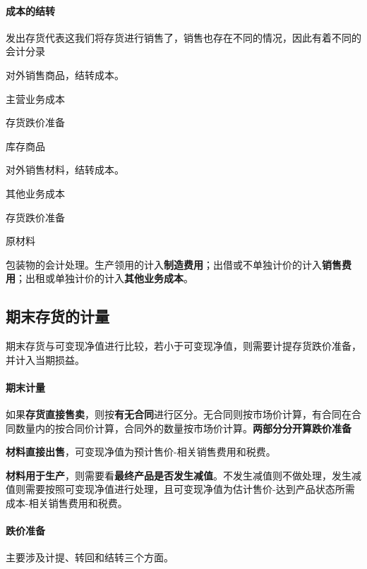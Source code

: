 \documentclass[UTF8,12pt]{ctexart}
\newenvironment{Dr}{%
	\begin{list}{}%
		{
			\setlength{\leftmargin}{2em}
			\setlength{\labelwidth}{2em}
			\setlength{\labelsep}{0pt}
			\setlength{\itemindent}{0pt}
			\setlength{\listparindent}{0pt}
			\setlength{\parsep}{0pt}
			\setlength{\topsep}{0pt}
		}
		\item[\textbf{借：}]
	}{%
	\end{list}
}
\newenvironment{Cr}{%
	\begin{list}{}%
		{
			\setlength{\leftmargin}{2em}
			\setlength{\labelwidth}{2em}
			\setlength{\labelsep}{0pt}
			\setlength{\itemindent}{0pt}
			\setlength{\listparindent}{0pt}
			\setlength{\parsep}{0pt}
			\setlength{\topsep}{0pt}
		}
		\item[\textbf{贷：}]
	}{%
	\end{list}
}
\numberwithin{equation}{section} %
\numberwithin{figure}{section}
\numberwithin{table}{section}
\begin{document}
	\paragraph{成本的结转} 发出存货代表这我们将存货进行销售了，销售也存在不同的情况，因此有着不同的会计分录
	\begin{enumerate}
		\item 对外销售商品，结转成本。
		
		\begin{Dr}
			主营业务成本
			
			存货跌价准备
		\end{Dr}
		\begin{Cr}
			库存商品
		\end{Cr}
		
		\item 对外销售材料，结转成本。
		
		\begin{Dr}
			其他业务成本
			
			存货跌价准备
		\end{Dr}
		\begin{Cr}
			原材料
		\end{Cr}
		
		\item 包装物的会计处理。生产领用的计入\textbf{制造费用}；出借或不单独计价的计入\textbf{销售费用}；出租或单独计价的计入\textbf{其他业务成本}。
	\end{enumerate}
	
	\subsection{期末存货的计量}
	期末存货与可变现净值进行比较，若小于可变现净值，则需要计提存货跌价准备，并计入当期损益。
	
	\paragraph{期末计量}
	如果\textbf{存货直接售卖}，则按\textbf{有无合同}进行区分。无合同则按市场价计算，有合同在合同数量内的按合同价计算，合同外的数量按市场价计算。\textbf{两部分分开算跌价准备}
	
	\textbf{材料直接出售}，可变现净值为预计售价-相关销售费用和税费。
	
	\textbf{材料用于生产}，则需要看\textbf{最终产品是否发生减值}。不发生减值则不做处理，发生减值则需要按照可变现净值进行处理，且可变现净值为估计售价-达到产品状态所需成本-相关销售费用和税费。
	
	\paragraph{跌价准备} 主要涉及计提、转回和结转三个方面。
	
\end{document}
